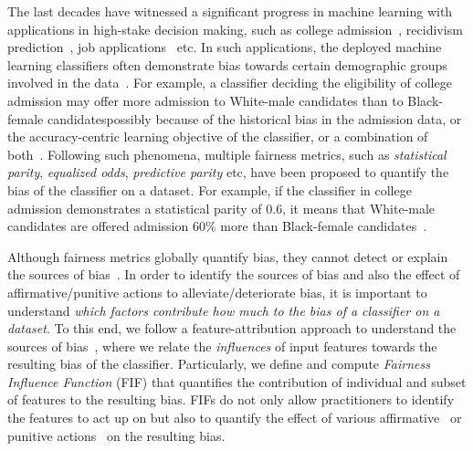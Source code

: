 \label{chapter:fif}
The last decades have witnessed a significant progress in machine learning with applications in high-stake decision making, such as college admission~\cite{martinez2021using}, recidivism prediction~\cite{tollenaar2013method}, job applications~\cite{ajunwa2016hiring} etc. In such applications, the deployed machine learning classifiers often demonstrate bias towards certain demographic groups involved in the data~\cite{dwork2012fairness}. For example, a classifier deciding the eligibility of college admission may offer more admission to White-male candidates than to Black-female candidates\textemdash possibly because of the historical bias in the admission data, or the accuracy-centric learning objective of the classifier, or a combination of both~\cite{berk2019accuracy,landy1978correlates,zliobaite2015relation}. Following such phenomena, multiple fairness metrics, such as \textit{statistical parity}, \textit{equalized odds}, \textit{predictive parity} etc, have been proposed to quantify the bias of the classifier on a dataset. For example, if the classifier in college admission demonstrates a {statistical parity} of $ 0.6 $, it means that White-male candidates are offered admission $ 60\% $ more than Black-female candidates~\cite{besse2021survey,feldman2015certifying,garg2020fairness}.

Although fairness metrics globally quantify bias, they cannot detect or explain the sources of bias~\cite{begley2020explainability,lundberg2020explaining,pan2021explaining}. In order to identify the sources of bias and also the effect of affirmative/punitive actions to alleviate/deteriorate bias, it is important to understand \textit{which factors contribute how much to the bias of a classifier on a dataset}. To this end, we follow a feature-attribution approach to understand the sources of bias~\cite{begley2020explainability,lundberg2020explaining}, where we relate the \emph{influences} of input features towards the resulting bias of the classifier. Particularly, we define and compute \textit{Fairness Influence Function} (FIF) that quantifies the contribution of individual and subset of features to the resulting bias. FIFs do not only allow practitioners to identify the features to act up on but also to quantify the effect of various affirmative~\cite{calmon2017optimized,hardt2016equality,kamiran2012decision,zemel2013learning,zhang2018mitigating,zhang2018fairness,zhang2019faht} or punitive actions~\cite{hua2021human,mehrabi2020exacerbating,solans2020poisoning} on the resulting bias. 


